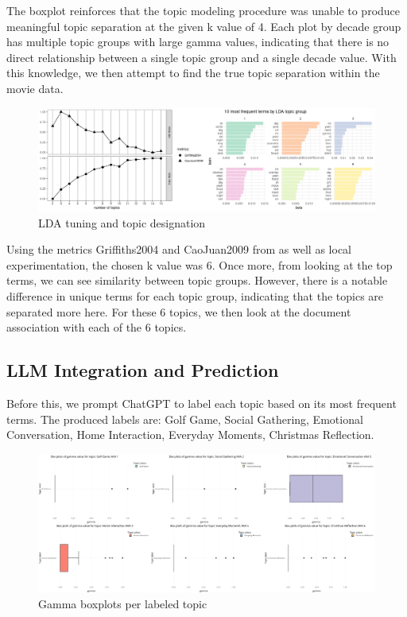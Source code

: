 \documentclass[
  authoryear,
  preprint]{elsarticle}
\begin{document}
The boxplot reinforces that the topic modeling procedure was unable to
produce meaningful topic separation at the given k value of 4. Each plot
by decade group has multiple topic groups with large gamma values,
indicating that there is no direct relationship between a single topic
group and a single decade value. With this knowledge, we then attempt to
find the true topic separation within the movie data.

\begin{figure}[H]

{\centering \includegraphics{images/lda6-imageonline.co-merged.png}

}

\caption{LDA tuning and topic designation}

\end{figure}%

Using the metrics Griffiths2004 and CaoJuan2009 from \citet{ldatuning}
as well as local experimentation, the chosen k value was 6. Once more,
from looking at the top terms, we can see similarity between topic
groups. However, there is a notable difference in unique terms for each
topic group, indicating that the topics are separated more here. For
these 6 topics, we then look at the document association with each of
the 6 topics.

\subsection{LLM Integration and
Prediction}\label{llm-integration-and-prediction}

Before this, we prompt ChatGPT to label each topic based on its most
frequent terms. The produced labels are: Golf Game, Social Gathering,
Emotional Conversation, Home Interaction, Everyday Moments, Christmas
Reflection.

\begin{figure}[H]

{\centering \includegraphics{images/top_topics_combined.png}

}

\caption{Gamma boxplots per labeled topic}

\end{figure}%
\end{document}
